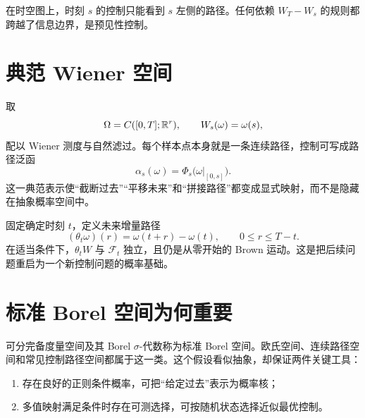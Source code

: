 \begin{intuition}[信息锥]
在时空图上，时刻 $s$ 的控制只能看到 $s$ 左侧的路径。任何依赖 $W_T-W_s$ 的规则都跨越了信息边界，是预见性控制。
\end{intuition}

\begin{center}
\end{center}

\section{典范 Wiener 空间}

取
\[
\Omega=C([0,T];\mathbb{R}^r),\qquad
W_s(\omega)=\omega(s),
\]
配以 Wiener 测度与自然滤过。每个样本点本身就是一条连续路径，控制可写成路径泛函
\[
\alpha_s(\omega)=\Phi_s\bigl(\omega|_{[0,s]}\bigr).
\]
这一典范表示使“截断过去”“平移未来”和“拼接路径”都变成显式映射，而不是隐藏在抽象概率空间中。

固定确定时刻 $t$，定义未来增量路径
\[
(\theta_t\omega)(r)=\omega(t+r)-\omega(t),\qquad 0\le r\le T-t.
\]
在适当条件下，$\theta_tW$ 与 $\mathcal F_t$ 独立，且仍是从零开始的 Brown 运动。这是把后续问题重启为一个新控制问题的概率基础。

\section{标准 Borel 空间为何重要}

可分完备度量空间及其 Borel $\sigma$-代数称为标准 Borel 空间。欧氏空间、连续路径空间和常见控制路径空间都属于这一类。这个假设看似抽象，却保证两件关键工具：

\begin{enumerate}
  \item 存在良好的正则条件概率，可把“给定过去”表示为概率核；
  \item 多值映射满足条件时存在可测选择，可按随机状态选择近似最优控制。
\end{enumerate}

